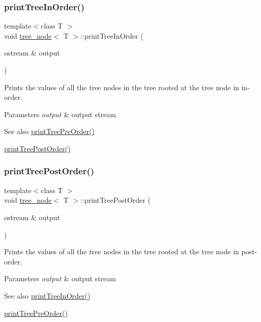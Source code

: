 \subsubsection{\texorpdfstring{print\+Tree\+In\+Order()}{printTreeInOrder()}}
{\footnotesize\ttfamily template$<$class T $>$ \\
void \hyperlink{classtree__node}{tree\+\_\+node}$<$ T $>$\+::print\+Tree\+In\+Order (\begin{DoxyParamCaption}\item[{ostream \&}]{output }\end{DoxyParamCaption})}

Prints the values of all the tree nodes in the tree rooted at the tree node in in-\/order. 
\begin{DoxyParams}{Parameters}
{\em output} & output stream \\
\hline
\end{DoxyParams}
\begin{DoxySeeAlso}{See also}
\hyperlink{classtree__node_af6b781b7c54d6ffa8fc3d8ddb15a184d}{print\+Tree\+Pre\+Order()} 

\hyperlink{classtree__node_a7a30637fff22c441f95e9e1b7cb34649}{print\+Tree\+Post\+Order()} 
\end{DoxySeeAlso}
\mbox{\label{classtree__node_a7a30637fff22c441f95e9e1b7cb34649}} 
\subsubsection{\texorpdfstring{print\+Tree\+Post\+Order()}{printTreePostOrder()}}
{\footnotesize\ttfamily template$<$class T $>$ \\
void \hyperlink{classtree__node}{tree\+\_\+node}$<$ T $>$\+::print\+Tree\+Post\+Order (\begin{DoxyParamCaption}\item[{ostream \&}]{output }\end{DoxyParamCaption})}

Prints the values of all the tree nodes in the tree rooted at the tree node in post-\/order. 
\begin{DoxyParams}{Parameters}
{\em output} & output stream \\
\hline
\end{DoxyParams}
\begin{DoxySeeAlso}{See also}
\hyperlink{classtree__node_a06d05cc3d2201be12bbeea10190a923f}{print\+Tree\+In\+Order()} 

\hyperlink{classtree__node_af6b781b7c54d6ffa8fc3d8ddb15a184d}{print\+Tree\+Pre\+Order()} 
\end{DoxySeeAlso}
\mbox{\label{classtree__node_af6b781b7c54d6ffa8fc3d8ddb15a184d}} 
